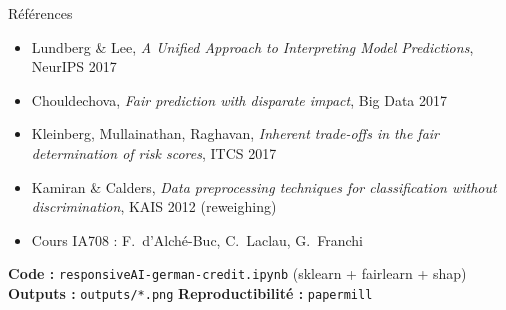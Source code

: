 \documentclass[aspectratio=169, 10pt]{beamer}
\begin{document}
\begin{frame}{R\'ef\'erences}
\small
\begin{itemize}
\item Lundberg \& Lee, \emph{A Unified Approach to Interpreting Model Predictions}, NeurIPS 2017
\item Chouldechova, \emph{Fair prediction with disparate impact}, Big Data 2017
\item Kleinberg, Mullainathan, Raghavan, \emph{Inherent trade-offs in the fair determination of risk scores}, ITCS 2017
\item Kamiran \& Calders, \emph{Data preprocessing techniques for classification without discrimination}, KAIS 2012 (reweighing)
\item Cours IA708 : F.~d'Alch\'e-Buc, C.~Laclau, G.~Franchi
\end{itemize}
\vfill
\centering\small
\textbf{Code :} \texttt{responsiveAI-german-credit.ipynb} (sklearn + fairlearn + shap)\\
\textbf{Outputs :} \texttt{outputs/*.png} \quad \textbf{Reproductibilit\'e :} \texttt{papermill}
\end{frame}
\end{document}
